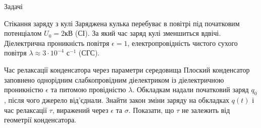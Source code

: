 \documentclass[onlytextwidth]{beamer}
\begin{document}
\begin{frame}[t]{Задачі}{}
	\begin{exampleblock}{Стікання заряду з кулі}
		Заряджена кулька перебуває в повітрі під початковим потенціалом $U_0 = 2\text{
				кВ}$ (СІ). За який час заряд кулі зменшиться вдвічі. Діелектрична проникність повітря
		$\epsilon = 1$, електропровідність чистого сухого повітря $ \lambda \approx 3
			\cdot 10^{-4} \text{ с}^{-1}$ (СГС).
	\end{exampleblock}

	\begin{exampleblock}{Час релаксації конденсатора через параметри середовища}\justifying
		Плоский конденсатор заповнено однорідним слабкопровідним діелектриком
		із діелектричною проникністю $\epsilon$ та питомою провідністю $\lambda$.
		Обкладкам надали початковий заряд $q_0$, після чого джерело від'єднали.
		Знайти закон зміни заряду на обкладках $q(t)$ і час релаксації $\tau$,
		виражений через $\epsilon$ та $\sigma$. Показати, що $\tau$ не залежить
		від геометрії конденсатора.
	\end{exampleblock}


\end{frame}
\end{document}
